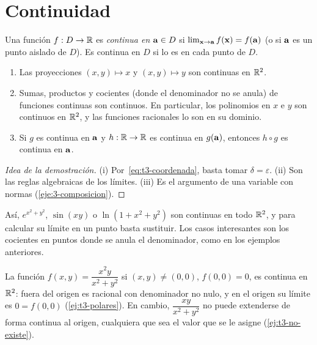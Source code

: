 \section{Continuidad}

\begin{definicion}[Continuidad]\label{def:continua-n}
Una función $f:D\to\mathbb{R}$ es \emph{continua en} $\mathbf{a}\in D$ si $\lim_{\mathbf{x}\to\mathbf{a}}f(\mathbf{x})=f(\mathbf{a})$ (o si $\mathbf{a}$ es un punto aislado de $D$). Es continua en $D$ si lo es en cada punto de $D$.
\end{definicion}

\begin{proposicion}\label{prop:continuas}
\begin{enumerate}
  \item Las proyecciones $(x,y)\mapsto x$ y $(x,y)\mapsto y$ son continuas en $\mathbb{R}^2$.
  \item Sumas, productos y cocientes (donde el denominador no se anula) de funciones continuas son continuos. En particular, los polinomios en $x$ e $y$ son continuos en $\mathbb{R}^2$, y las funciones racionales lo son en su dominio.
  \item Si $g$ es continua en $\mathbf{a}$ y $h:\mathbb{R}\to\mathbb{R}$ es continua en $g(\mathbf{a})$, entonces $h\circ g$ es continua en $\mathbf{a}$.
\end{enumerate}
\end{proposicion}

\begin{proof}[Idea de la demostración]
(i) Por~\eqref{eq:t3-coordenada}, basta tomar $\delta=\varepsilon$. (ii) Son las reglas algebraicas de los límites. (iii) Es el argumento de una variable con normas (\cref{eje:3-composicion}).
\end{proof}

Así, $e^{x^2+y^2}$, $\sin(xy)$ o $\ln(1+x^2+y^2)$ son continuas en todo $\mathbb{R}^2$, y para calcular su límite en un punto basta sustituir. Los casos interesantes son los cocientes en puntos donde se anula el denominador, como en los ejemplos anteriores.

\begin{ejemplo}\label{ej:t3-trozos}
La función $f(x,y)=\dfrac{x^2y}{x^2+y^2}$ si $(x,y)\neq(0,0)$, $f(0,0)=0$, es continua en $\mathbb{R}^2$: fuera del origen es racional con denominador no nulo, y en el origen su límite es $0=f(0,0)$ (\cref{ej:t3-polares}). En cambio, $\dfrac{xy}{x^2+y^2}$ no puede extenderse de forma continua al origen, cualquiera que sea el valor que se le asigne (\cref{ej:t3-no-existe}).
\end{ejemplo}

